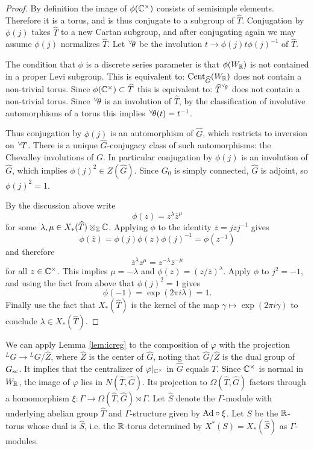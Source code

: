 \documentclass{article}
\newcommand{\inv}{^{-1}}
\theoremstyle{definition}
\numberwithin{equation}{section}
\renewcommand{\-}{\hyp{}}
\newcommand{\Cent}{\mathrm{Cent}}
\newcommand{\ch}[1]{\negthinspace\negthinspace\negthinspace\phantom{a}^\vee\negthinspace #1}
\begin{document}
\begin{proof}
By definition the image of $\phi(\mathbb{C}^\times)$ consists of semisimple elements.  Therefore it is a torus, and is thus conjugate to
a subgroup of $\hat T$. Conjugation by $\phi(j)$ takes $\hat T$ to a new Cartan subgroup, and after conjugating again
we may assume $\phi(j)$ normalizes $\hat T$. Let $\ch\theta$ be the involution $t\rightarrow \phi(j)t\phi(j)\inv$ of $\hat T$. 

The condition that $\phi$ is a discrete series parameter is that $\phi(W_{\mathbb{R}})$ is not contained in a proper Levi subgroup.
This is equivalent to: $\Cent_{\hat G}(W_\R)$ does not contain a non-trivial torus. Since $\phi(\mathbb{C}^\times)\subset\widehat T$ 
this is equivalent to: $\hat T^{\ch\theta}$ does not contain a non-trivial torus. Since $\ch\theta$ is an involution of $\hat T$,
by the classification of involutive automorphisms of a torus this implies $\ch\theta(t)=t\inv$. 


Thus conjugation by $\phi(j)$ is an automorphism of $\hat G$, which
restricts to inversion on $\ch T$. There is a unique
$\hat G$-conjugacy class of such automorphisms: the Chevalley
involutions of $G$. In particular conjugation by $\phi(j)$ is an
involution of $\hat G$, which implies $\phi(j)^2\in Z(\hat G)$. Since
$G_0$ is simply connected, $\hat G$ is adjoint, so $\phi(j)^2=1$.

By the discussion above write 
$$
\phi(z)=z^\lambda \overline z^\mu
$$
for some $\lambda,\mu\in X_*(\widehat T)\otimes_{\mathbb{Z}}\mathbb{C}$. Applying $\phi$ to the identity
$\overline z=jzj\inv$ gives
$$
\phi(\overline z)=\phi(j)\phi(z)\phi(j)\inv = \phi(z\inv)
$$
and therefore
$$
\overline z^\lambda z^\mu=z^{-\lambda}\overline z^{-\mu}
$$
for all $z\in \mathbb{C}^\times$. This implies $\mu=-\lambda$ and $\phi(z)=(z/\overline z)^\lambda$. 
Apply $\phi$ to $j^2=-1$, and using the fact from above that $\phi(j)^2=1$ gives
$$
\phi(-1)=\exp(2\pi i\lambda)=1.
$$
Finally use the fact that $X_*(\hat T)$ is the kernel of the map $\gamma\mapsto \exp(2\pi i\gamma)$ to conclude $\lambda\in X_*(\hat T)$.

\end{proof}

We can apply Lemma \ref{lem:icreg} to the composition of $\varphi$ with the projection $^LG \to {^LG}/\hat Z$, where $\hat Z$ is the center of $\hat G$, noting that $\hat G/\hat Z$ is the dual group of $G_{\textrm{sc}}$.
%
%
%
It implies that the centralizer of $\varphi|_{\mathbb{C}^\times}$ in $\hat G$ equals $\hat T$. Since $\mathbb{C}^\times$ is normal in $W_{\mathbb{R}}$, the image of $\varphi$ lies in $N(\hat T,\hat G)$. Its projection to $\Omega(\hat T,\hat G)$ factors through a homomorphism $\xi : \Gamma \to \Omega(\hat T,\hat G) \rtimes \Gamma$. Let $\hat S$ denote the $\Gamma$-module with underlying abelian group $\hat T$ and $\Gamma$-structure given by $\textrm{Ad}\circ\xi$. Let $S$ be the $\mathbb{R}$-torus whose dual is $\hat S$, i.e. the $\mathbb{R}$-torus determined by $X^*(S)=X_*(\hat S)$ as $\Gamma$-modules.
\end{document}

